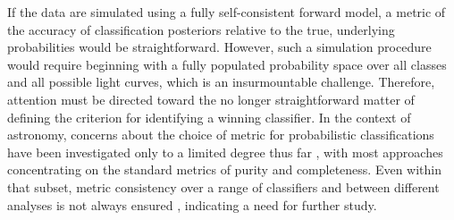 If the data are simulated using a fully self-consistent forward model, a metric of the accuracy of classification posteriors relative to the true, underlying probabilities would be straightforward.
However, such a simulation procedure would require beginning with a fully populated probability space over all classes and all possible light curves, which is an insurmountable challenge.
Therefore, attention must be directed toward the no longer straightforward matter of defining the criterion for identifying a winning classifier.
In the context of astronomy, concerns about the choice of metric for probabilistic classifications have been investigated only to a limited degree thus far \citep{florios_forecasting_2018, kim_stargalaxy_2017},
with most approaches concentrating on the standard metrics of purity and completeness.
Even within that subset, metric consistency over a range of classifiers and between different analyses is not always ensured \citep{bethapudi_separation_2018}, indicating a need for further study.

